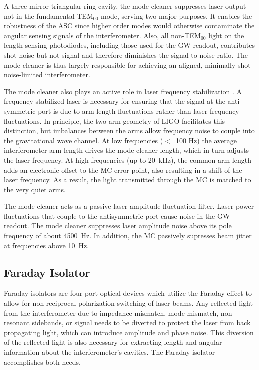 A three-mirror triangular ring cavity, the mode cleaner suppresses
laser output not in the fundamental TEM$_{00}$ mode, serving two major
purposes. It enables the robustness of the ASC since higher order
modes would otherwise contaminate the angular sensing signals of the
interferometer. Also, all non-TEM$_{00}$ light on the length sensing
photodiodes, including those used for the GW readout, contributes shot
noise but not signal and therefore diminishes the signal to noise
ratio. The mode cleaner is thus largely responsible for achieving an
aligned, minimally shot-noise-limited interferometer.

The mode cleaner also plays an active role in laser frequency
stabilization \citep{Zucker2002H1}. A frequency-stabilized laser is
necessary for ensuring that the signal at the anti-symmetric port is
due to arm length fluctuations rather than laser frequency
fluctuations. In principle, the two-arm geometry of LIGO facilitates
this distinction, but imbalances between the arms allow frequency
noise to couple into the gravitational wave channel. At low
frequencies ($<$~100 Hz) the average interferometer arm length drives
the mode cleaner length, which in turn adjusts the laser frequency. At
high frequencies (up to 20~kHz), the common arm length adds an
electronic offset to the MC error point, also resulting in a shift of
the laser frequency. As a result, the light transmitted through the MC
is matched to the very quiet arms.
 
The mode cleaner acts as a passive laser amplitude fluctuation
filter. Laser power fluctuations that couple to the antisymmetric port
cause noise in the GW readout.  The mode cleaner suppresses laser
amplitude noise above its pole frequency of about 4500~Hz. In
addition, the MC passively supresses beam jitter at frequencies above
10~Hz.


\subsection{Faraday Isolator}
Faraday isolators are four-port optical devices which utilize the
Faraday effect to allow for non-reciprocal polarization switching of
laser beams.  Any reflected light from the interferometer due to
impedance mismatch, mode mismatch, non-resonant sidebands, or signal
needs to be diverted to protect the laser from back propagating light,
which can introduce amplitude and phase noise.  This diversion of the
reflected light is also necessary for extracting length and angular
information about the interferometer's cavities. The Faraday isolator
accomplishes both needs.


